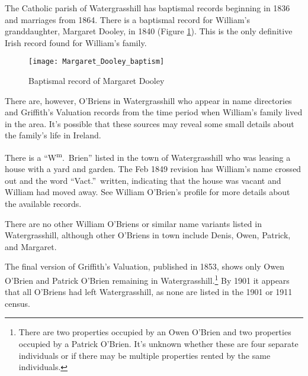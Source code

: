 {{The Catholic parish of Watergrasshill has baptismal records beginning in 1836 and marriages from 1864.\cite{ParishRecords} There is a baptismal record for William's granddaughter, Margaret Dooley, in 1840 (Figure \ref{fig:DooleyBaptism}). This is the only definitive Irish record found for William's family.\cite{Margaret3DooleyBaptism2}

\begin{figure}
	\centering
	\texttt{[image: Margaret\_Dooley\_baptism]}
	\caption{Baptismal record of Margaret Dooley}
	\label{fig:DooleyBaptism}
\end{figure}

There are, however, O'Briens in Watergrasshill who appear in name directories and Griffith's Valuation records from the time period when William's family lived in the area. It's possible that these sources may reveal some small details about the family's life in Ireland.

There is a ``W\textsuperscript{m}.\ Brien'' listed in the town of Watergrasshill who was leasing a house with a yard and garden.\cite{Valuation1849:1} The Feb 1849 revision has William's name crossed out and the word ``Vact.''\ written, indicating that the house was vacant and William had moved away.\cite{House1849} See William O'Brien's profile for more details about the available records.

There are no other William O'Briens or similar name variants listed in Watergrasshill, although other O'Briens in town include Denis,\cite{Valuation1849:2} Owen,\cite{Valuation1849:3} Patrick,\cite{Valuation1849:4} and Margaret.\cite{Valuation1849:5}

The final version of Griffith's Valuation, published in 1853, shows only Owen O'Bri\-en\cite{Griffiths:46,Griffiths:90:1} and Patrick O'Bri\-en\cite{Griffiths:90:2} remaining in Watergrasshill.\footnote{There are two properties occupied by an Owen O'Bri\-en and two properties occupied by a Patrick O'Bri\-en. It's unknown whether these are four separate individuals or if there may be multiple properties rented by the same individuals.} By 1901 it appears that all O'Bri\-ens had left Watergrasshill, as none are listed in the 1901 or 1911 census.\cite{1901IrishCensus,1911IrishCensus}

}}
